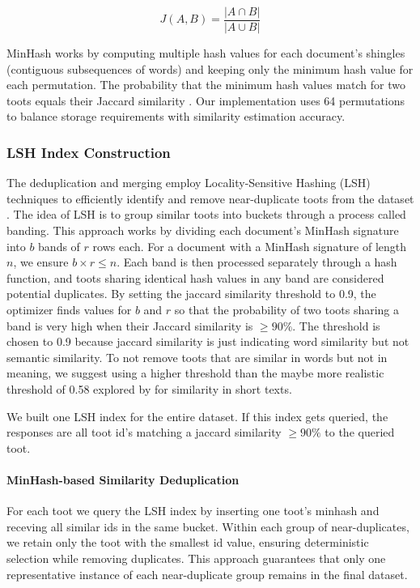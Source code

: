 \begin{equation}
J(A,B) = \frac{|A \cap B|}{|A \cup B|}
\end{equation}

MinHash works by computing multiple hash values for each document's shingles (contiguous subsequences of words) and keeping only the minimum hash value for each permutation. The probability that the minimum hash values match for two toots equals their Jaccard similarity \cite{broder:2000}. Our implementation uses 64 permutations to balance storage requirements with similarity estimation accuracy.

\subsubsection{LSH Index Construction}\label{step:lsh} 
The deduplication and merging employ Locality-Sensitive Hashing (LSH) techniques to efficiently identify and remove near-duplicate toots from the dataset \cite{leskovec:2014}. The idea of LSH is to group similar toots into buckets through a process called banding. This approach works by dividing each document's MinHash signature into $b$ bands of $r$ rows each. For a document with a MinHash signature of length $n$, we ensure $b \times r \le n$. Each band is then processed separately through a hash function, and toots sharing identical hash values in any band are considered potential duplicates. By setting the jaccard similarity threshold to 0.9, the optimizer finds values for $b$ and $r$ so that the probability of two toots sharing a band is very high when their Jaccard similarity is $\geq90\%$. The threshold is chosen to 0.9 because jaccard similarity is just indicating word similarity but not semantic similarity. To not remove toots that are similar in words but not in meaning, we suggest using a higher threshold than the maybe more realistic threshold of 0.58 explored by \citet{wu:2020} for similarity in short texts. 

We built one LSH index for the entire dataset. If this index gets queried, the responses are all toot id's matching a jaccard similarity $\geq90\%$ to the queried toot.

\paragraph{MinHash-based Similarity Deduplication}\label{step:dedup} 
For each toot we query the LSH index by inserting one toot's minhash and receving all similar ids in the same bucket. Within each group of near-duplicates, we retain only the toot with the smallest id value, ensuring deterministic selection while removing duplicates. This approach guarantees that only one representative instance of each near-duplicate group remains in the final dataset.

